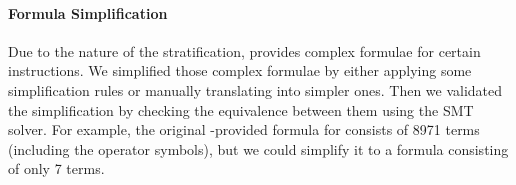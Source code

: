 



 
\paragraph{Formula Simplification}

Due to the nature of the stratification, \Strata provides complex formulae for certain instructions.
%
We simplified those complex formulae by either applying some simplification rules or manually translating into simpler ones.
Then we validated the simplification by checking the equivalence between them using the SMT solver.
%
For example, the original \Strata-provided formula for  consists of 8971 terms (including the operator symbols), but we could simplify it to a formula consisting of only 7 terms.








